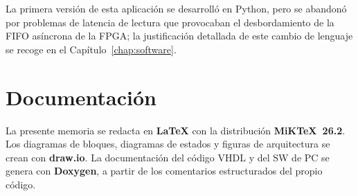 \documentclass[../main.tex]{subfiles}
\begin{document}
La primera versión de esta aplicación se desarrolló en Python, pero se abandonó por problemas de latencia de lectura que provocaban el desbordamiento de la \ac{FIFO} asíncrona de la FPGA; la justificación detallada de este cambio de lenguaje se recoge en el Capítulo~\ref{chap:software}.

\section{Documentación}
 
La presente memoria se redacta en \textbf{\LaTeX} con la distribución \textbf{MiKTeX~26.2}. Los diagramas de bloques, diagramas de estados y figuras de arquitectura se crean con \textbf{draw.io}. La documentación del código VHDL y del \ac{SW} de PC se genera con \textbf{Doxygen}, a partir de los comentarios estructurados del propio código.
\end{document}
